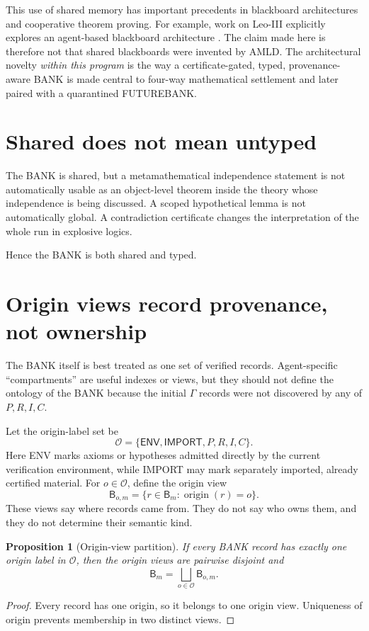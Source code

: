 \documentclass[11pt,openany]{book}
\newtheorem{proposition}[theorem]{Proposition}
\theoremstyle{definition}
\theoremstyle{remark}
\newcommand{\Bank}{\mathsf{B}}
\begin{document}
This use of shared memory has important precedents in blackboard architectures and cooperative theorem proving. For example, work on Leo-III explicitly explores an agent-based blackboard architecture \cite{Wisniewski2014}. The claim made here is therefore not that shared blackboards were invented by AMLD. The architectural novelty \emph{within this program} is the way a certificate-gated, typed, provenance-aware BANK is made central to four-way mathematical settlement and later paired with a quarantined FUTUREBANK.

\section{Shared does not mean untyped}
The BANK is shared, but a metamathematical independence statement is not automatically usable as an object-level theorem inside the theory whose independence is being discussed. A scoped hypothetical lemma is not automatically global. A contradiction certificate changes the interpretation of the whole run in explosive logics.

Hence the BANK is both shared and typed.

\section{Origin views record provenance, not ownership}
The BANK itself is best treated as one set of verified records. Agent-specific ``compartments'' are useful indexes or views, but they should not define the ontology of the BANK because the initial $\Gamma$ records were not discovered by any of $P,R,I,C$.

Let the origin-label set be
\[
\mathcal O=\{\mathsf{ENV},\mathsf{IMPORT},P,R,I,C\}.
\]
Here \textsf{ENV} marks axioms or hypotheses admitted directly by the current verification environment, while \textsf{IMPORT} may mark separately imported, already certified material. For $o\in\mathcal O$, define the origin view
\[
\Bank_{o,m}=\{r\in\Bank_m:\operatorname{origin}(r)=o\}.
\]
These views say where records came from. They do not say who owns them, and they do not determine their semantic kind.

\begin{proposition}[Origin-view partition]\label{prop:originpartition}
If every BANK record has exactly one origin label in $\mathcal O$, then the origin views are pairwise disjoint and
\[
\Bank_m=\bigsqcup_{o\in\mathcal O}\Bank_{o,m}.
\]
\end{proposition}
\begin{proof}
Every record has one origin, so it belongs to one origin view. Uniqueness of origin prevents membership in two distinct views.
\end{proof}
\end{document}
